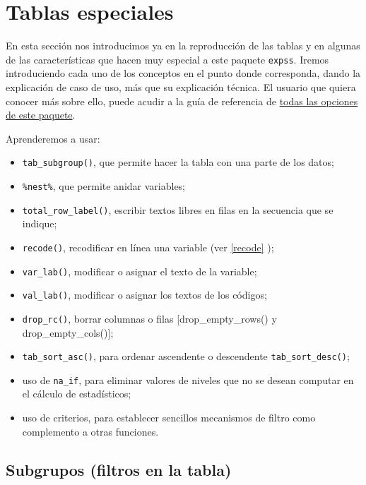 \documentclass[
]{book}
\providecommand{\tightlist}{%
  \setlength{\itemsep}{0pt}\setlength{\parskip}{0pt}}
\begin{document}
\hypertarget{tse05}{%
\chapter{Tablas especiales}\label{tse05}}

En esta sección nos introducimos ya en la reproducción de las tablas y en algunas de las características que hacen muy especial a este paquete \texttt{expss}. Iremos introduciendo cada uno de los conceptos en el punto donde corresponda, dando la explicación de caso de uso, más que su explicación técnica. El usuario que quiera conocer más sobre ello, puede acudir a la guía de referencia de \href{https://rdrr.io/cran/expss/man/}{todas las opciones de este paquete}.

Aprenderemos a usar:

\begin{itemize}
\tightlist
\item
  \texttt{tab\_subgroup()}, que permite hacer la tabla con una parte de los datos;
\item
  \texttt{\%nest\%}, que permite anidar variables;
\item
  \texttt{total\_row\_label()}, escribir textos libres en filas en la secuencia que se indique;
\item
  \texttt{recode()}, recodificar en línea una variable (ver \ref{recode} );
\item
  \texttt{var\_lab()}, modificar o asignar el texto de la variable;
\item
  \texttt{val\_lab()}, modificar o asignar los textos de los códigos;
\item
  \texttt{drop\_rc()}, borrar columnas o filas {[}drop\_empty\_rows() y drop\_empty\_cols(){]};
\item
  \texttt{tab\_sort\_asc()}, para ordenar ascendente o descendente \texttt{tab\_sort\_desc()};
\item
  uso de \texttt{na\_if}, para eliminar valores de niveles que no se desean computar en el cálculo de estadísticos;
\item
  uso de criterios, para establecer sencillos mecanismos de filtro como complemento a otras funciones.
\end{itemize}

\hypertarget{subgrupos-filtros-en-la-tabla}{%
\section{Subgrupos (filtros en la tabla)}\label{subgrupos-filtros-en-la-tabla}}
\end{document}
